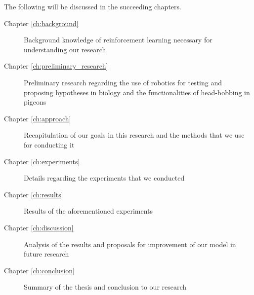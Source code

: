 The following will be discussed in the succeeding chapters.
\begin{description}
  \item [Chapter \ref{ch:background}] Background knowledge of reinforcement learning necessary for understanding our research
  \item [Chapter \ref{ch:preliminary_research}] Preliminary research regarding the use of robotics for testing and proposing hypotheses in biology and the functionalities of head-bobbing in pigeons
  \item [Chapter \ref{ch:approach}] Recapitulation of our goals in this research and the methods that we use for conducting it
  \item [Chapter \ref{ch:experiments}] Details regarding the experiments that we conducted
  \item [Chapter \ref{ch:results}] Results of the aforementioned experiments
  \item [Chapter \ref{ch:discussion}] Analysis of the results and proposals for improvement of our model in future research
  \item [Chapter \ref{ch:conclusion}] Summary of the thesis and conclusion to our research
\end{description}
